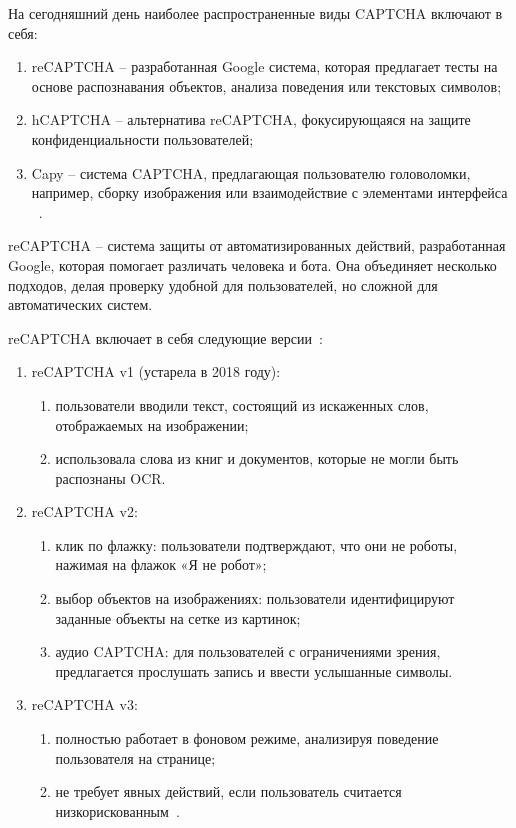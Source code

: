 На сегодняшний день наиболее распространенные виды CAPTCHA включают в себя:

\begin{enumerate}
    \item reCAPTCHA -- разработанная Google система, которая предлагает тесты 
    на основе распознавания объектов, анализа поведения или текстовых символов;
    \item hCAPTCHA -- альтернатива reCAPTCHA, фокусирующаяся на защите 
    конфиденциальности пользователей;
    \item Capy -- система CAPTCHA, предлагающая пользователю головоломки, 
    например, сборку изображения или взаимодействие с элементами интерфейса
    ~\cite{tproger}.
\end{enumerate}

reCAPTCHA -- система защиты от автоматизированных действий, разработанная Google, 
которая помогает различать человека и бота. Она объединяет несколько подходов, 
делая проверку удобной для пользователей, но сложной для автоматических систем.

reCAPTCHA включает в себя следующие версии~\cite{recaptchaversions}:

\begin{enumerate}
    \item reCAPTCHA v1 (устарела в 2018 году):
    \begin{enumerate}
        \item пользователи вводили текст, состоящий из искаженных слов, 
        отображаемых на изображении;
        \item использовала слова из книг и документов, которые не могли быть 
        распознаны OCR.
    \end{enumerate}
    \item reCAPTCHA v2:
    \begin{enumerate}
        \item клик по флажку: пользователи подтверждают, что они не роботы, 
        нажимая на флажок «Я не робот»;
        \item выбор объектов на изображениях: пользователи идентифицируют 
        заданные объекты на сетке из картинок;
        \item аудио CAPTCHA: для пользователей с ограничениями зрения, 
        предлагается прослушать запись и ввести услышанные символы.
    \end{enumerate}
    \item reCAPTCHA v3:
    \begin{enumerate}
        \item полностью работает в фоновом режиме, анализируя поведение 
        пользователя на странице;
        \item не требует явных действий, если пользователь считается 
        низкорискованным~\cite{recaptchaversions}.
    \end{enumerate}
\end{enumerate}

